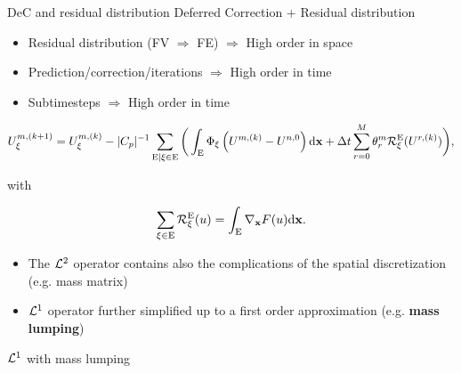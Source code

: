 \documentclass[aspectratio=169]{beamer}
\begin{document}
\begin{frame}{DeC and residual distribution}
	Deferred Correction + Residual distribution
	\begin{itemize}
		\item Residual distribution (FV  $\Rightarrow$ FE) $\Rightarrow$ High order in space
		\item Prediction/correction/iterations $\Rightarrow$ High order in time
		\item Subtimesteps $\Rightarrow$ High order in time
	\end{itemize}
	\begin{equation*}\label{oneline}
		\begin{split}
			U^{m,(k+1)}_\xi = U_\xi^{m,(k)} -
			|C_p|^{-1} 
			\sum_{\mathrm{E}|\xi \in \mathrm{E}}\bigg(\int_{\mathrm{E}} \Phi_\xi \left(U^{m,(k)} - U^{n,0} \right) \mathrm{d} \mathbf{x} +\Delta t
			\sum_{r=0}^M \theta_{r}^m \mathcal{R}_\xi^{\mathrm{E}}(U^{r,(k)}) \bigg),
		\end{split}
	\end{equation*}
	\begin{center}
		with
	\end{center}
	\begin{equation*}\label{eq:L2RDspacetime}
		\sum_{\xi \in {\mathrm{E}}} {\mathcal{R}}^{{\mathrm{E}}}_\xi (u) = \int_{\mathrm{E}} \nabla_\mathbf{x}F(u)
		\mathrm{d} \mathbf{x}.
	\end{equation*}
\begin{itemize}
	\item The $\mathcal{L}^2$ operator contains also the complications of the spatial discretization (e.g. mass matrix)\vspace{2mm}
	\item $\mathcal{L}^1$ operator further simplified up to a first order approximation (e.g. \textbf{mass lumping}) 
\end{itemize}
\end{frame}

\begin{frame}{$\mathcal{L}^1$ with mass lumping}
	
\end{frame}
\end{document}
